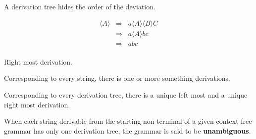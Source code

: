 \documentclass[a4paper,12pt]{article}
\newcommand{\nonterminal}[1]{$\langle #1 \rangle$}
\begin{document}
\begin{figure}[ht]


\pstree{\TR{\nonterminal{A}}}{
	\TR{$a$}
	\pstree{\TR{\nonterminal{A}}}{
		\TR{$e$}
		\Tn
	}
	\pstree{\TR{\nonterminal{B}}}{
		\Tn
		\TR{$b$}
	}
	\TR{$c$}
}

\end{figure}

A derivation tree hides the order of the deviation.

\begin{eqnarray*}
\langle A \rangle &	\Rightarrow	&	a \langle A \rangle \langle B \rangle C \\
						&	\Rightarrow	&	a \langle A \rangle b c \\
						&	\Rightarrow	&	abc	\\
\end{eqnarray*}

Right most derivation.


Corresponding to every string, there is one or more something
derivations.

Corresponding to every derivation tree, there is a unique left most and
a unique right most derivation.

When each string derivable from the starting non-terminal of a given
context free grammar has only one derivation tree, the grammar is said
to be \textbf{unambiguous}.
\end{document}
